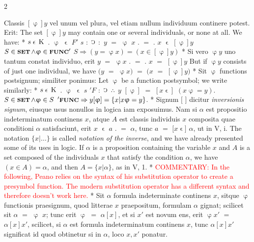 \documentclass{book}
\newcommand{\C}{\mathop{\sbox0{$\displaystyle$$\reflectbox{C}$} %
\raisebox{-\height+\ht0-0.05cm}[\ht0][\dp0]{\scalebox{0.8}[0.8]{\copy0}}}\displaylimits} %
\newcommand{\pppNoSpace}{\leavevmode\lower0ex\hbox{.}\kern-0.1em\raise0.7ex\hbox{.}\kern-0.1em\lower0ex\hbox{.}} %
\newcommand{\smallIn}{\ensuremath{\mathrel{\epsilon}}}
\newcommand{\K}{\mathop{\thinspace \text{K} \thinspace}}
\newcommand{\setOfSets}{\mathop{\text{{\footnotesize \textbf{SET}}}}}
\newcommand{\func}{\mathord{\text{{\footnotesize \textbf{FUNC}}}}}
\renewcommand{\rightarrow}{\Rightarrow}
\newcommand\commentary[1]{\textcolor{red}{COMMENTARY: #1}}
\newenvironment{translateTwoCol}
               { %
                 \columnratio{0.5, 0.5}
                 \begin{paracol}{2}
                 \newcommand{\LAT}{\switchcolumn[0]*}
                 \newcommand{\ENG}{\switchcolumn[1]}
               }
               { %
                 \let\ENG\undefined
                 \let\LAT\undefined
                 \end{paracol}
               }
\begin{document}
\begin{translateTwoCol}
Classis $[\upvarphi] y$ vel unum vel plura, vel etiam nullum individuum continere potest. Erit:
\ENG
The set $[\upvarphi] y$ may contain one or several individuals, or none at all. We have:
\LAT
\hspace{1.06cm} $s \smallIn \K$ $.$ $\upvarphi$ $\smallIn$ $F'$ $s$ $:$ $\C$ $:$ $y$ $=$ $\upvarphi$ $x$ $.$ $=$ $.$ $x$ $\smallIn$ $[\upvarphi] y$
\ENG
\hspace{1.06cm} $S \in \setOfSets \wedge \upvarphi \in \func'$ $S \rightarrow (y = \upvarphi x)=(x \in [\upvarphi] y)$
\LAT
Si vero $\upvarphi y$ uno tantum constat individuo, erit $y$ $=$ $\upvarphi x$ $.$ $=$ $.$ $x$ $=$ $[\upvarphi] y$
\ENG
But if $\upvarphi y$ consists of just one individual, we have $(y$ $=$ $\upvarphi x)$ $=$ $(x$ $=$ $[\upvarphi] y)$
\LAT
Sit $\upvarphi$ functions postsignum; similiter ponimus:
\ENG
Let $\upvarphi$ be a function postsymbol; we write similarly:
\LAT
\hspace{1.06cm} $s \smallIn \K$ $.$ $\upvarphi$ $\smallIn$ $s$ $'F$ $:$ $\C$ $\pppNoSpace$ $y$ $[ \upvarphi ]$ $=$ $[ x\smallIn ]$ $(x \upvarphi = y)$.  %
\ENG
\hspace{1.06cm} $S \in \setOfSets \wedge \upvarphi \in S$ $'\func \rightarrow y [ \upvarphi ] = \{ x | x \upvarphi = y\}$.
\LAT
Signum $[$ $]$ dicitur \emph{inversionis signum}, eiusque usus nonullos in logica iam exposuimus. Nam si $\alpha$ est propositio indeterminatum continens $x$, atque $A$ est classis individuis $x$ composita quae conditioni $\alpha$ satisfaciunt, erit $x$ $\smallIn$ $a$ $.$ $=$ $\alpha$, tunc $a$ $=$ $[x$\smallIn$]$ $\alpha$, ut in V, i.
\ENG
The notation $\{ x | \ldots \}$ is called \emph{notation of the inverse}, and we have already presented some of its uses in logic. If $\alpha$ is a proposition containing the variable $x$ and $A$ is a set composed of the individuals $x$ that satisfy the condition $\alpha$, we have $(x \in A) = \alpha$, and then $A = \{ x | \alpha \}$, as in V, 1. %
\LAT
\ENG
\commentary{In the following, Peano relies on the syntax of his substitution operator to create a presymbol function.  The modern substitution operator has a different syntax and therefore doesn't work here.}
\LAT
Sit $\alpha$ formula indeterminate continens $x$, sitque $\upvarphi$ functionis praesignum, quod litterae $x$ praepositum, formulam $\alpha$ gignat; scilicet sit $\alpha$ $=$ $\upvarphi$ $x$; tunc erit $\upvarphi$ $=$ $\alpha [x]$, et si $x'$ est novum ens, erit $\upvarphi x'$ $=$ $\alpha [x] x'$, scilicet, si $\alpha$ est formula indeterminatum continens $x$, tunc $\alpha [x] x'$ significat id quod obtinetur si in $\alpha$, loco $x, x'$ ponatur.

\end{translateTwoCol}
\end{document}

